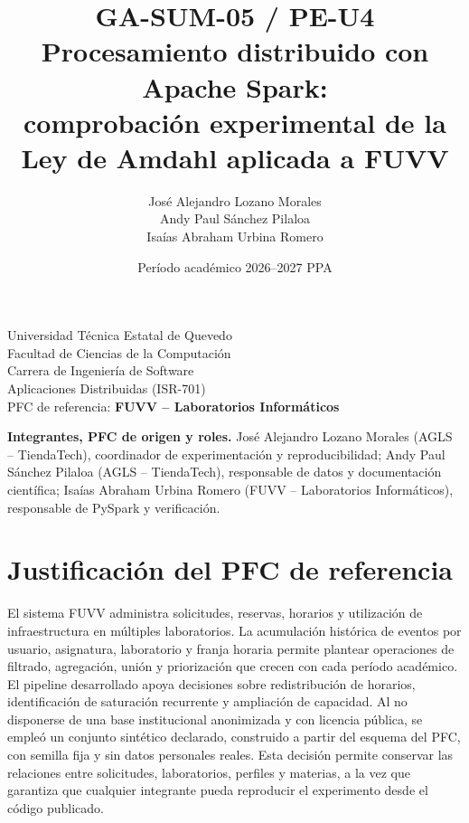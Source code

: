 \documentclass[11pt,a4paper]{article}
\title{\textbf{GA-SUM-05 / PE-U4}\\Procesamiento distribuido con Apache Spark:\\comprobación experimental de la Ley de Amdahl aplicada a FUVV}
\author{José Alejandro Lozano Morales\\Andy Paul Sánchez Pilaloa\\Isaías Abraham Urbina Romero}
\date{Período académico 2026--2027 PPA}
\begin{document}
\maketitle
\begin{center}
Universidad Técnica Estatal de Quevedo\\
Facultad de Ciencias de la Computación\\
Carrera de Ingeniería de Software\\
Aplicaciones Distribuidas (ISR-701)\\[1em]
PFC de referencia: \textbf{FUVV -- Laboratorios Informáticos}
\end{center}

\noindent\textbf{Integrantes, PFC de origen y roles.}
José Alejandro Lozano Morales (AGLS -- TiendaTech), coordinador de experimentación y reproducibilidad;
Andy Paul Sánchez Pilaloa (AGLS -- TiendaTech), responsable de datos y documentación científica;
Isaías Abraham Urbina Romero (FUVV -- Laboratorios Informáticos), responsable de PySpark y verificación.

\section*{Justificación del PFC de referencia}
El sistema FUVV administra solicitudes, reservas, horarios y utilización de infraestructura en múltiples laboratorios. La acumulación histórica de eventos por usuario, asignatura, laboratorio y franja horaria permite plantear operaciones de filtrado, agregación, unión y priorización que crecen con cada período académico. El pipeline desarrollado apoya decisiones sobre redistribución de horarios, identificación de saturación recurrente y ampliación de capacidad. Al no disponerse de una base institucional anonimizada y con licencia pública, se empleó un conjunto sintético declarado, construido a partir del esquema del PFC, con semilla fija y sin datos personales reales. Esta decisión permite conservar las relaciones entre solicitudes, laboratorios, perfiles y materias, a la vez que garantiza que cualquier integrante pueda reproducir el experimento desde el código publicado.

\newpage
\tableofcontents
\newpage
\end{document}
